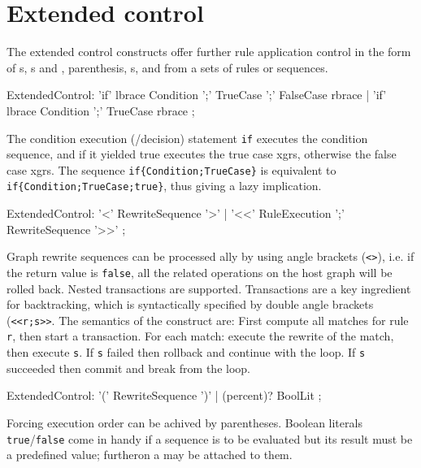 \section{Extended control}

The extended control constructs offer further rule application control in the form of s, s and , parenthesis, s, and  from a sets of rules or sequences.

\begin{rail} 
  ExtendedControl: 
	'if' lbrace Condition ';' TrueCase ';' FalseCase rbrace |
	'if' lbrace Condition ';' TrueCase rbrace
	;
\end{rail}

The condition execution (/decision) statement \texttt{if} executes the condition sequence, and if it yielded true executes the true case xgrs, otherwise the false case xgrs.
The sequence \verb#if{Condition;TrueCase}# is equivalent to \verb#if{Condition;TrueCase;true}#, thus giving a lazy implication.

\begin{rail} 
  ExtendedControl: 
    '<' RewriteSequence '>' | 
    '<<' RuleExecution ';' RewriteSequence '>>'
	;
\end{rail}

Graph rewrite sequences can be processed ally by using angle brackets (\texttt{<>}), i.e.
if the return value is \texttt{false}, all the related operations on the host graph will be rolled back.
Nested transactions are supported.
Transactions are a key ingredient for backtracking, which is syntactically specified by double angle brackets (\texttt{<<r;s>>}.
The semantics of the construct are:
First compute all matches for rule \texttt{r}, then start a transaction.
For each match: execute the rewrite of the match, then execute \texttt{s}.
If \texttt{s} failed then rollback and continue with the loop.
If \texttt{s} succeeded then commit and break from the loop.

\begin{rail} 
  ExtendedControl: 
    '(' RewriteSequence ')' |
    (percent)? BoolLit
	;
\end{rail}

Forcing execution order can be achived by parentheses.
Boolean literals \texttt{true}/\texttt{false} come in handy if a sequence is to be evaluated 
but its result must be a predefined value; furtheron a  may be attached to them.

